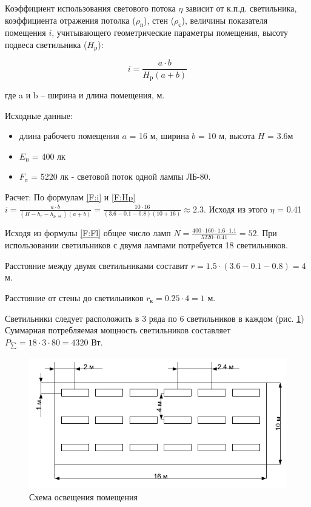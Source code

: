 \begin{enumerate}
Коэффициент использования светового потока $\eta$ зависит от к.п.д. светильника, коэффициента отражения потолка ($\rho_\text{п}$), стен ($\rho_\text{с}$), величины показателя помещения $i$, учитывающего геометрические параметры помещения, высоту подвеса светильника ($H_\text{p}$):

\begin{equation}
i = \frac{a \cdot b}{H_\text{p} (a + b)}
\label{F:i}
\end{equation}

где a и b – ширина и длина помещения, м.

Исходные данные:
\begin{itemize}
\item длина рабочего помещения $a$ = 16 м, ширина $b$ = 10 м, высота $H$ = 3.6м
\item $E_\text{н}$ = 400 лк
\item $F_\text{л}$ = 5220 лк - световой поток одной лампы ЛБ-80.
\end{itemize}

Расчет:
По формулам \ref{F:i} и \ref{F:Hp} $i = \frac{a \cdot b}{(H - h_{\text{c}} - h_{\text{р. м.}}) (a + b)} = \frac{10 \cdot 16}{(3.6-0.1-0.8) (10 + 16)} \approx 2.3$. Исходя из этого $\eta$ = 0.41

Исходя из формулы \ref{F:Fl} общее число ламп $N = \frac{400 \cdot 160 \cdot 1.6 \cdot 1.1}{5220 \cdot 0.41} = 52$. При использовании светильников с двумя лампами потребуется 18 светильников.

Расстояние между двумя светильниками составит $r = 1.5 \cdot (3.6 - 0.1 - 0.8) = 4$ м.

Расстояние от стены до светильников $r_\text{к} = 0.25 \cdot 4 = 1$ м.
\end{enumerate}

Светильники следует расположить в 3 ряда по 6 светильников в каждом (рис. \ref{fig:illuminationScheme})
Суммарная потребляемая мощность светильников составляет $P_{\sum} = 18 \cdot 3 \cdot 80 = 4320$ Вт.

\begin{figure}[ht!]
\centering
\includegraphics{static_include/illuminationScheme.png}
\caption{Схема освещения помещения}
\label{fig:illuminationScheme}
\end{figure}

